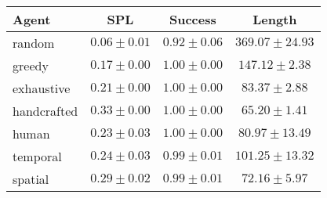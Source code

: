 \begin{tabular}{lccc}
    \toprule
    Agent & SPL & Success & Length \\
    \midrule
    random & $0.06 \pm 0.01$ & $0.92 \pm 0.06$ & $369.07 \pm 24.93$\\
    greedy & $0.17 \pm 0.00$ & $1.00 \pm 0.00$ & $147.12 \pm 2.38$\\
    exhaustive & $0.21 \pm 0.00$ & $1.00 \pm 0.00$ & $83.37 \pm 2.88$\\
    handcrafted & $0.33 \pm 0.00$ & $1.00 \pm 0.00$ & $65.20 \pm 1.41$\\
    human & $0.23 \pm 0.03$ & $1.00 \pm 0.00$ & $80.97 \pm 13.49$\\
    \midrule
    temporal & $0.24 \pm 0.03$ & $0.99 \pm 0.01$ & $101.25 \pm 13.32$\\
    spatial & $0.29 \pm 0.02$ & $0.99 \pm 0.01$ & $72.16 \pm 5.97$\\
    \bottomrule
\end{tabular}
